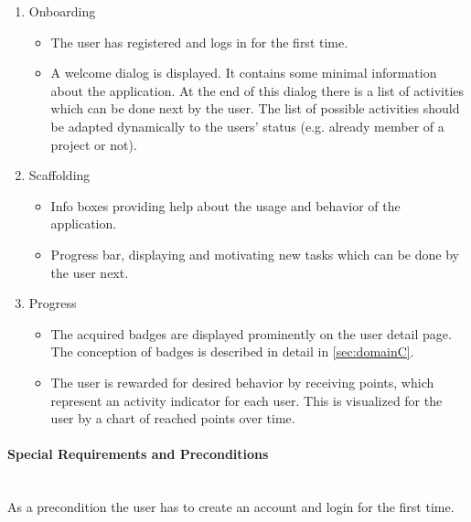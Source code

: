 \begin{enumerate}
	\vspace{-3mm}
	\setlength\itemsep{-1em}
	
	\item Onboarding
	\begin{itemize}
		\vspace{-3mm}
		\setlength\itemsep{-1em}
		
		\item The user has registered and logs in for the first time.
		\item A welcome dialog is displayed. It contains some minimal information about the application. At the end of this dialog there is a list of activities which can be done next by the user. The list of possible activities should be adapted dynamically to the users' status (e.g. already member of a project or not).
	\end{itemize}

	\item Scaffolding
	\begin{itemize}
		\vspace{-3mm}
		\setlength\itemsep{-1em}
		
		\item Info boxes providing help about the usage and behavior of the application.
		\item Progress bar, displaying and motivating new tasks which can be done by the user next.
	\end{itemize}

	\item Progress
	\begin{itemize}
		\vspace{-3mm}
		\setlength\itemsep{-1em}	
		\item The acquired badges are displayed prominently on the user detail page. The conception of badges is described in detail in \ref{sec:domainC}.
		\item The user is rewarded for desired behavior by receiving points, which represent an activity indicator for each user. This is visualized for the user by a chart of reached points over time.
	\end{itemize}
\end{enumerate}

\paragraph*{Special Requirements and Preconditions}\mbox{}\\
As a precondition the user has to create an account and login for the first time. 

